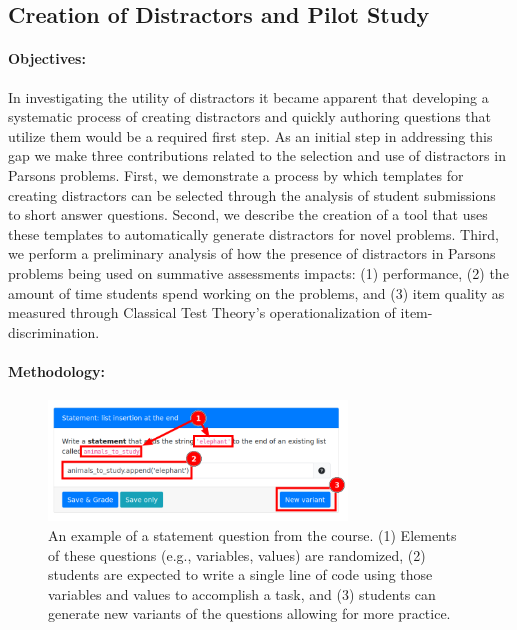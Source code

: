 \documentclass[authorversion,nonacm]{acmart}
\begin{document}
\subsection{Creation of Distractors and Pilot Study}\label{sec:creation}

\paragraph{Objectives:} In investigating the utility of distractors it became 
apparent that developing a systematic process of creating distractors and 
quickly authoring questions that utilize them would be a required first step.
As an initial step in addressing this gap we make three contributions related to
the selection and use of distractors in Parsons problems. First, we demonstrate
a process by which templates for creating distractors can be selected through
the analysis of student submissions to short answer questions. Second, we
describe the creation of a tool that uses these templates to automatically
generate distractors for novel problems. Third, we perform a preliminary
analysis of how the presence of distractors in Parsons problems being used on
summative assessments impacts: (1) performance, (2) the amount of time students
spend working on the problems, and (3) item quality as measured through
Classical Test Theory's operationalization of item-discrimination.

\paragraph{Methodology:}

\begin{figure}
  \centering
  \includegraphics[width=300px]{imgs/pl-question.png}
  \caption{
    An example of a statement question from the course. (1) Elements of these
    questions (e.g., variables, values) are randomized, (2) students are
    expected to write a single line of code using those variables and values to
    accomplish a task, and (3) students can generate new variants of the
    questions allowing for more practice.
  } 
  \label{fig:append-stmnt}
\end{figure}
\end{document}
